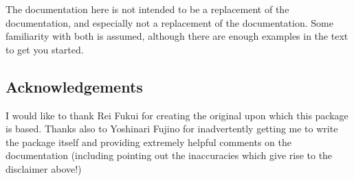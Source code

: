 \documentclass{article}
\begin{document}
The documentation here is not intended to be a replacement of the  documentation, and especially not a replacement of the  documentation. Some familiarity with both is assumed, although there are enough examples in the text to get you started.
\subsection{Acknowledgements}
I would like to thank Rei Fukui for creating the original  upon which this package is based. Thanks also to Yoshinari Fujino for inadvertently getting me to write the package itself and providing extremely helpful comments on the documentation (including pointing out the inaccuracies which give rise to the disclaimer above!)
\end{document}
